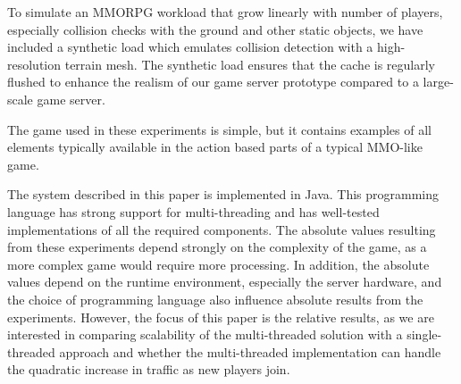 

To simulate an MMORPG workload that grow linearly with number of
players, especially collision checks with the ground and other static
objects, we have included a synthetic load which emulates collision
detection with a high-resolution terrain mesh. The synthetic load
ensures that the cache is regularly flushed
to enhance the realism of our game server prototype compared to a
large-scale game server.

The game used in these experiments is simple, but it contains examples of all elements typically available in the action based parts of a typical MMO-like game. 

The system described in this paper is implemented in Java. This
programming language has strong support for multi-threading and has
well-tested implementations of all the required components. The
absolute values resulting from these experiments depend strongly on
the complexity of the game, as a more complex game would require more
processing. In addition, the absolute values depend on the runtime
environment, especially the server hardware, and the choice of programming
language also influence absolute results from the
experiments. However, the focus of this paper is the relative results,
as we are interested in comparing scalability of the multi-threaded
solution with a single-threaded approach and whether the
multi-threaded implementation can handle the quadratic increase in
traffic as new players join.
